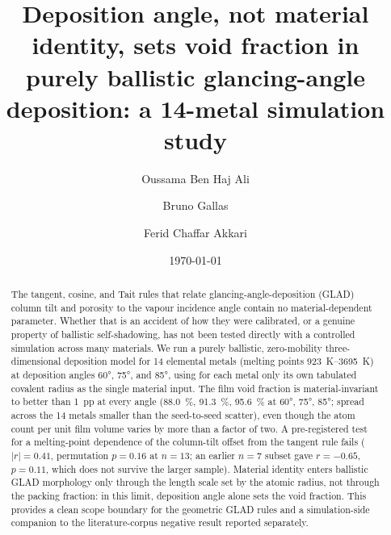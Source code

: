 \documentclass[aip,jcp,amsmath,amssymb,reprint]{revtex4-1}
\begin{document}
\title{Deposition angle, not material identity, sets void fraction in
purely ballistic glancing-angle deposition: a 14-metal simulation study}

\author{Oussama Ben Haj Ali}
\author{Bruno Gallas}
\author{Ferid Chaffar Akkari}

\date{\today}

\begin{abstract}
The tangent, cosine, and Tait rules that relate glancing-angle-deposition (GLAD)
column tilt and porosity to the vapour incidence angle contain no
material-dependent parameter. Whether that is an accident of how they were
calibrated, or a genuine property of ballistic self-shadowing, has not been
tested directly with a controlled simulation across many materials. We run a
purely ballistic, zero-mobility three-dimensional deposition model for
\num{14} elemental metals (melting points \SIrange{923}{3695}{K}) at deposition
angles \ang{60}, \ang{75}, and \ang{85}, using for each metal only its own
tabulated covalent radius as the single material input. The film void fraction is
material-invariant to better than \SI{1}{pp} at every angle
(\SI{88.0}{\percent}, \SI{91.3}{\percent}, \SI{95.6}{\percent} at \ang{60},
\ang{75}, \ang{85}; spread across the \num{14} metals smaller than the
seed-to-seed scatter), even though the atom count per unit film volume varies by
more than a factor of two. A pre-registered test for a melting-point dependence
of the column-tilt offset from the tangent rule fails
($|r| = 0.41$, permutation $p = 0.16$ at $n = 13$; an earlier $n = 7$ subset gave
$r = -0.65$, $p = 0.11$, which does not survive the larger sample). Material
identity enters ballistic GLAD morphology only through the length scale set by
the atomic radius, not through the packing fraction: in this limit, deposition
angle alone sets the void fraction. This provides a clean scope boundary for the
geometric GLAD rules and a simulation-side companion to the literature-corpus
negative result reported separately.
\end{abstract}
\end{document}
